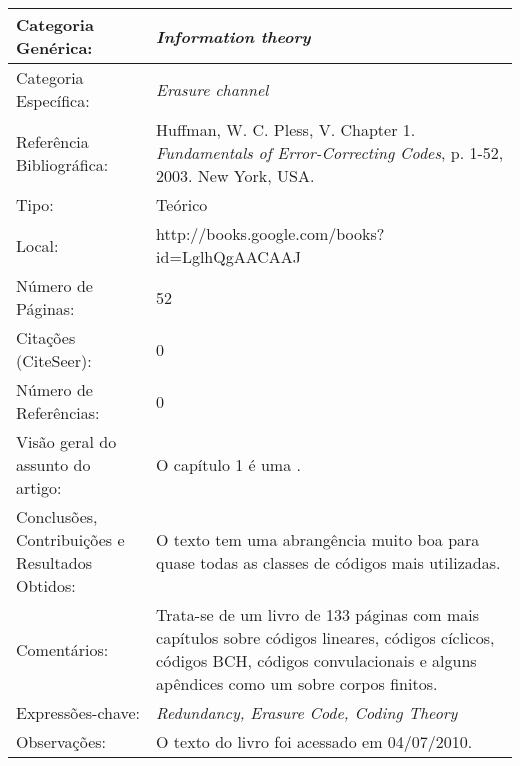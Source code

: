 \documentclass[10pt,a4paper]{article}
\begin{document}
\begin{center}
\begin{tabular}{|p{5cm}||p{10cm}|}
\hline

Categoria Genérica: & \emph{Information theory}\\\hline
Categoria Específica: & \emph{Erasure channel}\\\hline
Referência Bibliográfica: & Huffman, W. C. Pless, V. Chapter 1. \emph{Fundamentals of Error-Correcting Codes}, p. 1-52, 2003. New York, USA. \\\hline
Tipo: & Teórico\\\hline
Local: & http://books.google.com/books?id=LglhQgAACAAJ\\\hline
Número de Páginas: & 52\\\hline
Citações (CiteSeer): & 0\\\hline
Número de Referências: & 0\\\hline
Visão geral do assunto do artigo: & O capítulo 1 é uma .\\\hline
Conclusões, Contribuições e Resultados Obtidos: &  O texto tem uma abrangência muito boa para quase todas as classes de códigos mais utilizadas. \\\hline
Comentários: & Trata-se de um livro de 133 páginas com mais capítulos sobre códigos lineares, códigos cíclicos, códigos BCH, códigos convulacionais e alguns apêndices como um sobre corpos finitos.\\\hline
Expressões-chave: & \emph{Redundancy, Erasure Code, Coding Theory}\\\hline
Observações: &  O texto do livro foi acessado em 04/07/2010.\\\hline

\end{tabular}
\end{center}
\end{document}
